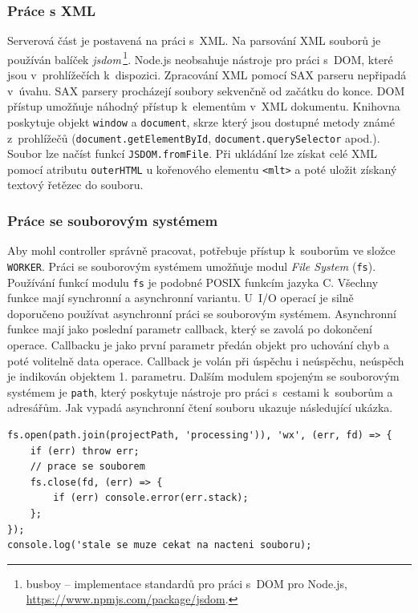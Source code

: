 \subsubsection{Práce s XML}
Serverová část je postavená na práci s~XML. Na parsování XML souborů je používán balíček \textit{jsdom}\,\footnote{busboy -- implementace standardů pro práci s~DOM pro Node.js, \url{https://www.npmjs.com/package/jsdom}.}. Node.js neobsahuje nástroje pro práci s~DOM, které jsou v~prohlížečích k~dispozici. Zpracování XML pomocí SAX parseru nepřipadá v~úvahu. SAX parsery procházejí soubory sekvenčně od začátku do konce. DOM přístup umožňuje náhodný přístup k~elementům v~XML dokumentu. Knihovna poskytuje objekt \texttt{window} a \texttt{document}, skrze který jsou dostupné metody známé z~prohlížečů (\texttt{document.getElementById}, \texttt{document.querySelector} apod.). Soubor lze načíst funkcí \texttt{JSDOM.fromFile}. Při ukládání lze získat celé XML pomocí atributu \texttt{outerHTML} u kořenového elementu \texttt{<mlt>} a poté uložit získaný textový řetězec do souboru.

\subsubsection{Práce se souborovým systémem}
Aby mohl controller správně pracovat, potřebuje přístup k~souborům ve složce \texttt{WORKER}. Práci se souborovým systémem umožňuje modul \textit{File System} (\texttt{fs}). Používání funkcí modulu \texttt{fs} je podobné POSIX funkcím jazyka C. Všechny funkce mají synchronní a asynchronní variantu. U~I/O operací je silně doporučeno používat asynchronní práci se souborovým systémem. Asynchronní funkce mají jako poslední parametr callback, který se zavolá po dokončení operace. Callbacku je jako první parametr předán objekt pro uchování chyb a poté volitelně data operace. Callback je volán při úspěchu i neúspěchu, neúspěch je indikován objektem 1. parametru. Dalším modulem spojeným se souborovým systémem je \texttt{path}, který poskytuje nástroje pro práci s~cestami k~souborům a adresářům. Jak vypadá asynchronní čtení souboru ukazuje následující ukázka.
\begin{lstlisting}[style=JavaScript]
fs.open(path.join(projectPath, 'processing')), 'wx', (err, fd) => {
    if (err) throw err;
    // prace se souborem
    fs.close(fd, (err) => {
        if (err) console.error(err.stack);
    };
});
console.log('stale se muze cekat na nacteni souboru);
\end{lstlisting}

